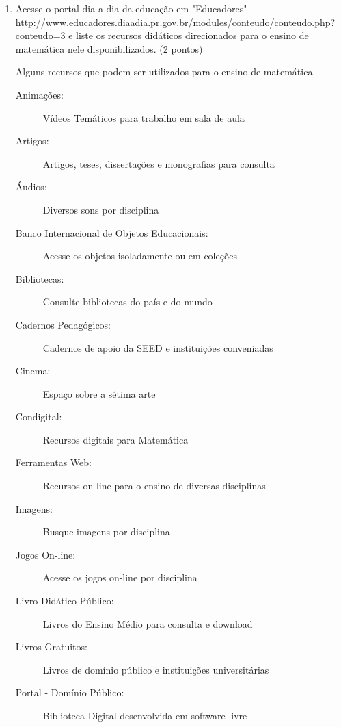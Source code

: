 \documentclass[a4paper, 12pt]{article}
\begin{document}
\begin{enumerate}
\begin{enumerate}
    \item Acesse o portal dia-a-dia da educação  em  "Educadores"
      \url{http://www.educadores.diaadia.pr.gov.br/modules/conteudo/conteudo.php?conteudo=3}
      e liste os recursos didáticos direcionados para o ensino de matemática nele disponibilizados. (2 pontos) \\

      Alguns recursos que podem ser utilizados para o ensino de matemática. \\
      \begin{description}
      \item[Animações:] Vídeos Temáticos para trabalho em sala de aula
      \item[Artigos:] Artigos, teses, dissertações e monografias para consulta
      \item[Áudios:] Diversos sons por disciplina
      \item[Banco Internacional de Objetos Educacionais:] Acesse os objetos isoladamente ou em coleções
      \item[Bibliotecas:] Consulte bibliotecas do país e do mundo
      \item[Cadernos Pedagógicos:] Cadernos de apoio da SEED e instituições conveniadas
      \item[Cinema:] Espaço sobre a sétima arte
      \item[Condigital:] Recursos digitais para Matemática
      \item[Ferramentas Web:] Recursos on-line para o ensino de diversas disciplinas
      \item[Imagens:] Busque imagens por disciplina
      \item[Jogos On-line:] Acesse os jogos on-line por disciplina
      \item[Livro Didático Público:] Livros do Ensino Médio para consulta e download
      \item[Livros Gratuitos:] Livros de domínio público e instituições universitárias
      \item[Portal - Domínio Público:] Biblioteca Digital desenvolvida em software livre

\end{description}
\end{enumerate}
\end{enumerate}
\end{document}
